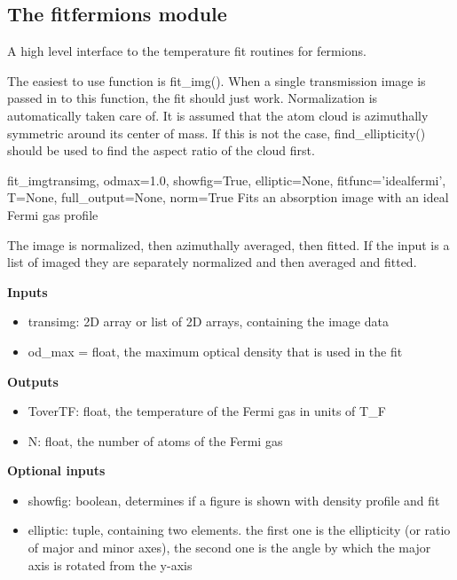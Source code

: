 \documentclass[letterpaper,10pt,english]{manual}
\begin{document}
\subsection{The fitfermions module}
\modulesynopsis{}
A high level interface to the temperature fit routines for fermions.

The easiest to use function is fit\_img(). When a single transmission image
is passed in to this function, the fit should just work. Normalization
is automatically taken care of. It is assumed that the atom cloud is
azimuthally symmetric around its center of mass. If this is not the case,
find\_ellipticity() should be used to find the aspect ratio of the cloud first.

\hypertarget{fitfermions.fit_img}{}\begin{funcdesc}{fit\_img}{transimg, odmax=1.0, showfig=True, elliptic=None, fitfunc='idealfermi', T=None, full\_output=None, norm=True}
Fits an absorption image with an ideal Fermi gas profile

The image is normalized, then azimuthally averaged, then fitted. If the
input is a list of imaged they are separately normalized and then averaged
and fitted.

\textbf{Inputs}
\begin{itemize}
\item {} 
transimg: 2D array or list of 2D arrays, containing the image data

\item {} 
od\_max = float, the maximum optical density that is used in the fit

\end{itemize}

\textbf{Outputs}
\begin{itemize}
\item {} 
ToverTF: float, the temperature of the Fermi gas in units of T\_F

\item {} 
N: float, the number of atoms of the Fermi gas

\end{itemize}

\textbf{Optional inputs}
\begin{itemize}
\item {} 
showfig: boolean, determines if a figure is shown with density profile and fit

\item {} 
elliptic: tuple, containing two elements. the first one is the
ellipticity (or ratio of major and minor axes), the second one is the
angle by which the major axis is rotated from the y-axis


\end{itemize}
\end{funcdesc}
\end{document}
